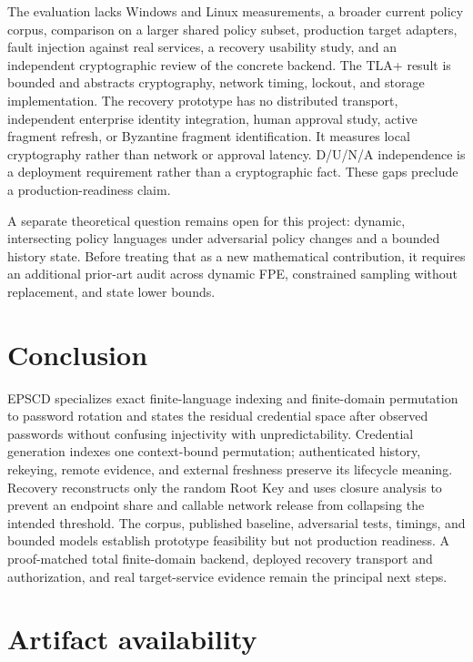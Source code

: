 \documentclass[preprint,12pt]{elsarticle}
\begin{document}
The evaluation lacks Windows and Linux measurements, a broader current policy
corpus, comparison on a larger shared policy subset, production target
adapters, fault injection against real services, a recovery usability study,
and an independent cryptographic review of the concrete backend. The TLA+
result is bounded and abstracts cryptography, network timing, lockout, and
storage implementation. The recovery prototype has no distributed transport,
independent enterprise identity integration, human approval study, active
fragment refresh, or Byzantine fragment identification. It measures local
cryptography rather than network or approval latency. D/U/N/A independence is
a deployment requirement rather than a cryptographic fact. These gaps preclude
a production-readiness claim.

A separate theoretical question remains open for this project: dynamic,
intersecting policy languages under adversarial policy changes and a bounded
history state. Before treating that as a new mathematical contribution, it
requires an additional prior-art audit across dynamic FPE, constrained
sampling without replacement, and state lower bounds.

\section{Conclusion}

EPSCD specializes exact finite-language indexing and finite-domain permutation
to password rotation and states the residual credential space after observed
passwords without confusing injectivity with unpredictability. Credential
generation indexes one context-bound permutation; authenticated history,
rekeying, remote evidence, and external freshness preserve its lifecycle
meaning. Recovery reconstructs only the random Root Key and uses closure
analysis to prevent an endpoint share and callable network release from
collapsing the intended threshold. The corpus, published baseline, adversarial
tests, timings, and bounded models establish prototype feasibility but not
production readiness. A proof-matched total finite-domain backend, deployed
recovery transport and authorization, and real target-service evidence remain
the principal next steps.

\appendix


\section*{Artifact availability}
\end{document}
